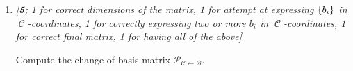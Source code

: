 \documentclass{amsart}
\theoremstyle{definition}
\theoremstyle{definition}
\newtheorem*{solution}{Solution}
\DeclareMathOperator{\1}{\mathbbm{1}}
\DeclareMathOperator{\MM}{\mathcal{M}}
\DeclareMathOperator{\CC}{\mathcal{C}}
\newcommand{\Tau}{\mathcal{T}}
\begin{document}
\begin{enumerate}[itemsep = 2mm]
\begin{enumerate}[label=\arabic*.]
\begin{solution}
				It is slightly unpleasant to calculate the other matrix, though; note that $T(c_i) = c_i$ for $i=1,3,4$, but
				\begin{align*}
				T(c_2) = \begin{bmatrix}
				1 & \\ 1 &
				\end{bmatrix} = c_3 - c_2 + c_1
				\end{align*}
				hence
				\begin{equation}
					\label{eqmatrixC}
					\MM(\Tau,\CC) = \begin{bmatrix}
					1 & 1 & & \\ & -1 & & \\ & 1 & 1 & \\ & & & 1
					\end{bmatrix}
				\end{equation}
			\end{solution}
			
			
			\item \textit{[\textbf{5}; 1 for correct dimensions of the matrix, 1 for attempt at expressing $\set{b_i}$ in $\CC$-coordinates, 1 for correctly expressing two or more $b_i$ in $\CC$-coordinates, 1 for correct final matrix, 1 for having all of the above]}
			
			Compute the change of basis matrix $\mathcal{P}_{\mathcal{C}\leftarrow \mathcal{B}}$.
			

\end{enumerate}
\end{enumerate}
\end{document}
